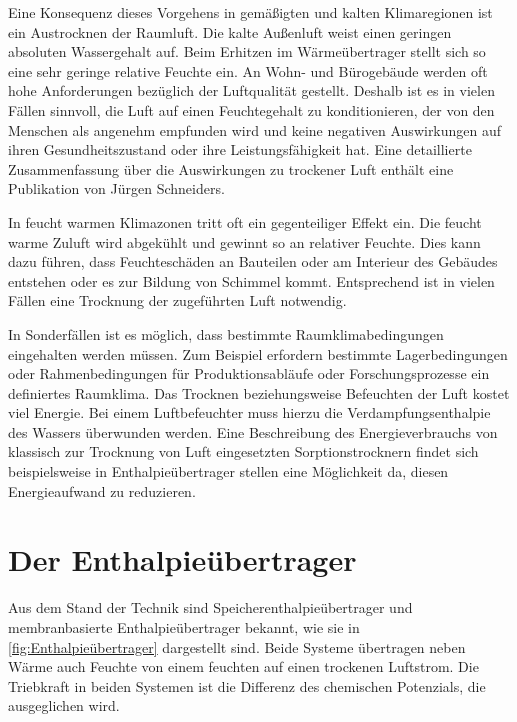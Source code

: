 \begin{normalsize}
\begin{LARGE}
Eine Konsequenz dieses Vorgehens in gemäßigten und kalten Klimaregionen ist ein Austrocknen der Raumluft. Die kalte Außenluft weist einen geringen absoluten Wassergehalt auf. Beim Erhitzen im Wärmeübertrager stellt sich so eine sehr geringe relative Feuchte ein. 
An Wohn- und Bürogebäude werden oft hohe Anforderungen bezüglich der Luftqualität gestellt. Deshalb ist es in vielen Fällen sinnvoll, die Luft auf einen Feuchtegehalt zu konditionieren, der von den Menschen als angenehm empfunden wird und keine negativen Auswirkungen auf ihren Gesundheitszustand oder ihre Leistungsfähigkeit hat. Eine detaillierte Zusammenfassung über die Auswirkungen zu trockener Luft enthält eine Publikation von Jürgen Schneiders.\cite{JurgenSchniedersDr.RainerPflugerDr.WolfgangFeist.Oktober}

In feucht warmen Klimazonen tritt oft ein gegenteiliger Effekt ein. Die feucht warme Zuluft wird abgekühlt und gewinnt so an relativer Feuchte. Dies kann dazu führen, dass Feuchteschäden an Bauteilen oder am Interieur des Gebäudes entstehen oder es zur Bildung von Schimmel kommt. Entsprechend ist in vielen Fällen eine Trocknung der zugeführten Luft notwendig. \cite{Zhang.2010}

In Sonderfällen ist es möglich, dass bestimmte Raumklimabedingungen eingehalten werden müssen. Zum Beispiel erfordern bestimmte Lagerbedingungen oder Rahmenbedingungen für Produktionsabläufe oder Forschungsprozesse ein definiertes Raumklima. 
Das Trocknen beziehungsweise Befeuchten der Luft kostet viel Energie. Bei einem Luftbefeuchter muss hierzu die Verdampfungsenthalpie des Wassers überwunden werden. Eine Beschreibung des Energieverbrauchs von klassisch zur Trocknung von Luft eingesetzten Sorptionstrocknern findet sich beispielsweise in \cite{Zhang.2006}
Enthalpieübertrager stellen eine Möglichkeit da, diesen Energieaufwand zu reduzieren. 

\section{Der Enthalpieübertrager}
\label{Der Enthalpieübertrager}

Aus dem Stand der Technik sind Speicherenthalpieübertrager und membranbasierte Enthalpieübertrager bekannt, wie sie in \ref{fig:Enthalpieübertrager} dargestellt sind. Beide Systeme übertragen neben Wärme auch Feuchte von einem feuchten auf einen trockenen Luftstrom. Die Triebkraft in beiden Systemen ist die Differenz des chemischen Potenzials, die ausgeglichen wird. 


\end{LARGE}
\end{normalsize}
